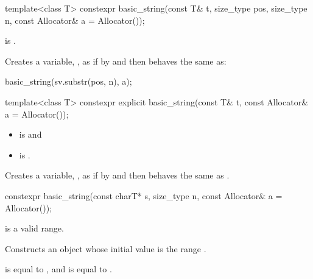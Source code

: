 %
\begin{itemdecl}
template<class T>
  constexpr basic_string(const T& t, size_type pos, size_type n, const Allocator& a = Allocator());
\end{itemdecl}

\begin{itemdescr}
\pnum
\constraints
{}
is .

\pnum
\effects
Creates a variable, ,
as if by 
and then behaves the same as:
\begin{codeblock}
basic_string(sv.substr(pos, n), a);
\end{codeblock}
\end{itemdescr}

%
\begin{itemdecl}
template<class T>
  constexpr explicit basic_string(const T& t, const Allocator& a = Allocator());
\end{itemdecl}

\begin{itemdescr}
\pnum
\constraints
\begin{itemize}
\item
{} is
 and
\item
{} is
.
\end{itemize}

\pnum
\effects
Creates a variable, , as if by
 and
then behaves the same as .
\end{itemdescr}

%
\begin{itemdecl}
constexpr basic_string(const charT* s, size_type n, const Allocator& a = Allocator());
\end{itemdecl}

\begin{itemdescr}
\pnum
\expects
{} is a valid range.

\pnum
\effects
Constructs an object whose initial value is the range .

\pnum
\ensures
{} is equal to , and
 is equal to .
\end{itemdescr}

